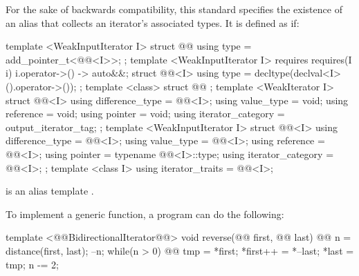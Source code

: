 \begin{addedblock}
\pnum
For the sake of backwards compatibility, this standard specifies the existence of an 
alias that collects an iterator's associated types. It is defined as if:

%
\begin{codeblock}
  template <WeakInputIterator I> struct @@ {
    using type = add_pointer_t<@@<I>>;
  };
  template <WeakInputIterator I>
    requires requires(I i) { { i.operator->() } -> auto&&; }
  struct @@<I> {
    using type = decltype(declval<I>().operator->());
  };
  template <class> struct @@ { };
  template <WeakIterator I> struct @@<I> {
    using difference_type = @@<I>;
    using value_type = void;
    using reference = void;
    using pointer = void;
    using iterator_category = output_iterator_tag;
  };
  template <WeakInputIterator I> struct @@<I> {
    using difference_type = @@<I>;
    using value_type = @@<I>;
    using reference = @@<I>;
    using pointer = typename @@<I>::type;
    using iterator_category = @@<I>;
  };
  template <class I>
    using iterator_traits = @@<I>;
\end{codeblock}

\pnum
\enternote
{} is an alias template
.
\exitnote

\end{addedblock}

\pnum
\enterexample
To implement a generic
function, a \Cpp program can do the following:

\begin{codeblock}
template <@@BidirectionalIterator@@>
void reverse(@@ first, @@ last) {
  @@ n =
    distance(first, last);
  --n;
  while(n > 0) {
    @@
      tmp = *first;
    *first++ = *--last;
    *last = tmp;
    n -= 2;
  }
}
\end{codeblock}
\exitexample

